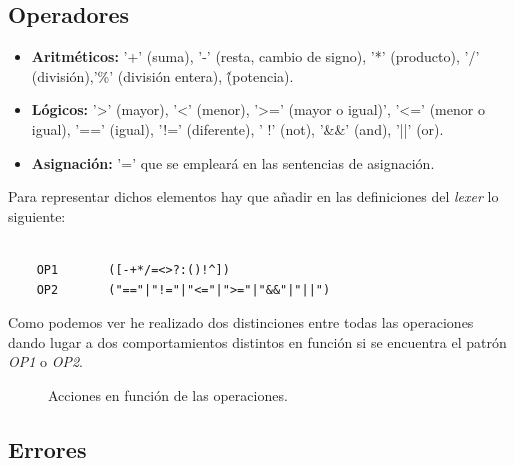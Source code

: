 \documentclass[11pt]{article}
\begin{document}
\subsection{Operadores}

\begin{itemize}
    \item \textbf{Aritméticos:} '+' (suma), '-' (resta, cambio de signo), '*' (producto), '/' (división),'\%' (división entera), \^ (potencia).
     \item \textbf{Lógicos:} '>' (mayor), '<' (menor), '>=' (mayor o igual)', '<=' (menor o igual), '=='
(igual), '!=' (diferente), ' !' (not), '\&\&' (and), '||' (or).
    \item \textbf{Asignación:} '=' que se empleará en las sentencias de asignación.
\end{itemize}

\noindent Para representar dichos elementos hay que añadir en las definiciones del \textit{lexer} lo siguiente: 

\begin{verbatim}

    OP1       ([-+*/=<>?:()!^])
    OP2       ("=="|"!="|"<="|">="|"&&"|"||")

\end{verbatim}

\noindent Como podemos ver he realizado dos distinciones entre todas las operaciones dando lugar a dos comportamientos distintos en función si se encuentra el patrón \textit{OP1} o \textit{OP2}.

\begin{figure}[H]
  \centering
  \caption{Acciones en función de las operaciones.}
\end{figure}

\newpage

\subsection{Errores}
\end{document}
